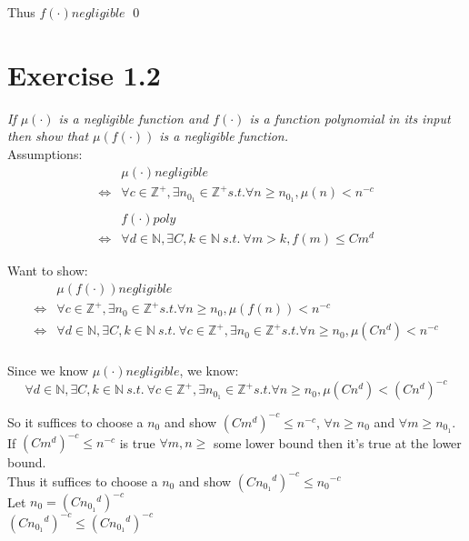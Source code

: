 \documentclass[11pt]{article}
\begin{document}
Thus $f(\cdot) negligible$ \qed

\section*{Exercise 1.2}

\textit{If $\mu(\cdot)$ is a negligible function and $f(\cdot)$ is a function polynomial in its input then show that $\mu(f(\cdot))$ is a negligible function.
} \\

Assumptions:
\begin{align*}
        &\mu(\cdot) negligible \\
\iff &\forall c \in \mathbb{Z}^{+}, \exists n_{0_1} \in \mathbb{Z}^{+} s.t. \forall n \geq n_{0_1}, \mu(n) < n^{-c} \\
\\
&f(\cdot) poly \\
\iff &\forall d \in \mathbb{N}, \exists C,k \in \mathbb{N}\ s.t.\ \forall m > k, f(m) \leq Cm^{d}
\end{align*}

Want to show:
\begin{align*}
        &\mu(f(\cdot)) negligible \\
\iff &\forall c \in \mathbb{Z}^{+}, \exists n_0 \in \mathbb{Z}^{+} s.t. \forall n \geq n_0, \mu(f(n)) < n^{-c} \\
\iff &\forall d \in \mathbb{N}, \exists C,k \in \mathbb{N}\ s.t.\  \forall c \in \mathbb{Z}^{+}, \exists n_0 \in \mathbb{Z}^{+} s.t. \forall n \geq n_0, \mu(Cn^d) < n^{-c} \\
\end{align*}

Since we know $\mu(\cdot) negligible$, we know:
$$
\forall d \in \mathbb{N}, \exists C,k \in \mathbb{N}\ s.t.\  \forall c \in \mathbb{Z}^{+}, \exists n_{0_1} \in \mathbb{Z}^{+} s.t. \forall n \geq n_0, \mu(Cn^d) < (Cn^d)^{-c}
$$

So it suffices to choose a $n_0$ and show $(Cm^d)^{-c} \leq n^{-c}$, $\forall n \geq n_0$ and $\forall m \geq n_{0_1}$. \\

If $(Cm^d)^{-c} \leq n^{-c}$ is true $\forall m,n \geq$ some lower bound  then it's true at the lower bound. \\

Thus it suffices to choose a $n_0$ and show $(C{n_{0_1}}^d)^{-c} \leq {n_0}^{-c}$ \\
Let $n_0 = (C{n_{0_1}}^d)^{-c}$ \\
$(C{n_{0_1}}^d)^{-c} \leq (C{n_{0_1}}^d)^{-c}$ \\
\end{document}
